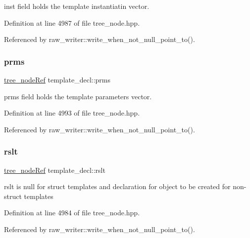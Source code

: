 inst field holds the template instantiatin vector. 



Definition at line 4987 of file tree\+\_\+node.\+hpp.



Referenced by raw\+\_\+writer\+::write\+\_\+when\+\_\+not\+\_\+null\+\_\+point\+\_\+to().

\mbox{\label{structtemplate__decl_aa8e7937b3112c96c9523096d517bace2}} 
\subsubsection{\texorpdfstring{prms}{prms}}
{\footnotesize\ttfamily \hyperlink{tree__node_8hpp_a6ee377554d1c4871ad66a337eaa67fd5}{tree\+\_\+node\+Ref} template\+\_\+decl\+::prms}



prms field holds the template parameters vector. 



Definition at line 4993 of file tree\+\_\+node.\+hpp.



Referenced by raw\+\_\+writer\+::write\+\_\+when\+\_\+not\+\_\+null\+\_\+point\+\_\+to().

\mbox{\label{structtemplate__decl_acecaebf7c65aed34842145e2bf1fccde}} 
\subsubsection{\texorpdfstring{rslt}{rslt}}
{\footnotesize\ttfamily \hyperlink{tree__node_8hpp_a6ee377554d1c4871ad66a337eaa67fd5}{tree\+\_\+node\+Ref} template\+\_\+decl\+::rslt}



rslt is null for struct templates and declaration for object to be created for non-\/struct templates 



Definition at line 4984 of file tree\+\_\+node.\+hpp.



Referenced by raw\+\_\+writer\+::write\+\_\+when\+\_\+not\+\_\+null\+\_\+point\+\_\+to().

